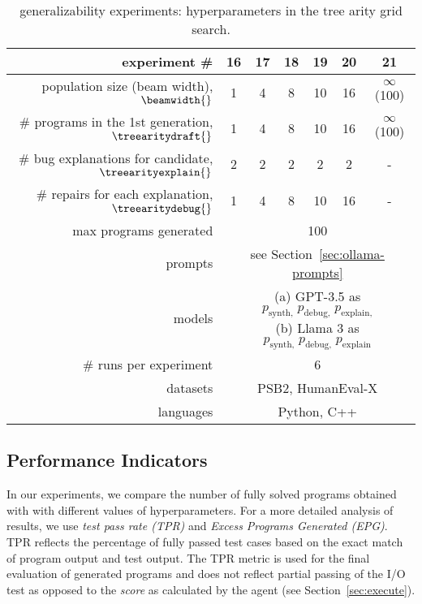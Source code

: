 \begin{table}[t]
\setlength{\tabcolsep}{10pt}
\centering
\caption{\method{} generalizability experiments: hyperparameters in the tree arity grid search.}\small
\label{tab:w-n-generalizability}
\begin{tabular}{rcccccc}
\toprule
experiment \# & 16 & 17 & 18 & 19 & 20 & 21\\
\midrule
population size (beam width), $\beamwidth{}$ & 1 & 4 & 8 & 10 & 16 & $\infty$ (100) \\[4pt]
\# programs in the 1st generation, $\treearitydraft{}$ & 1 & 4 & 8 & 10 & 16 & $\infty$ (100) \\[4pt]
\# bug explanations for candidate, $\treearityexplain{}$ & 2 & 2 & 2 & 2 & 2 & - \\[4pt]
\# repairs for each explanation, $\treearitydebug{}$ & 1 & 4 & 8 & 10 & 16 & - \\[4pt]
\midrule
max programs generated & \multicolumn{6}{c}{100} \\[4pt]
prompts & \multicolumn{6}{c}{see Section~\ref{sec:ollama-prompts}} \\[4pt]
models  & \multicolumn{6}{c}{
 \parbox{5cm}{
     (a) GPT-3.5 as $p_\text{synth,} \; p_\text{debug,} \; p_\text{explain,}$ \\
     (b) Llama 3 as $p_\text{synth,} \; p_\text{debug,} \; p_\text{explain}$
     }
} \\[10pt]
\midrule
\# runs per experiment &  \multicolumn{6}{c}{6} \\[4pt]
datasets  & \multicolumn{6}{c}{PSB2, HumanEval-X} \\[4pt] 
languages  & \multicolumn{6}{c}{Python, C++} \\[4pt]
\bottomrule
\end{tabular}
\end{table}

\subsection{Performance Indicators}
\label{sec:metrics}

\sloppy %
In our experiments, we compare 
the number of fully solved programs obtained with \method{} with different values of hyperparameters. 
For a more detailed analysis of results, we use \emph{test pass rate (TPR)} and \emph{Excess Programs Generated (EPG)}.
TPR reflects the percentage of fully passed test cases based on the exact match of program output and test output. 
The TPR metric is used for the final evaluation of generated programs and does not reflect partial passing of the I/O test as opposed to the \emph{score} as calculated by the \rank{} agent (see Section~\ref{sec:execute}). 

